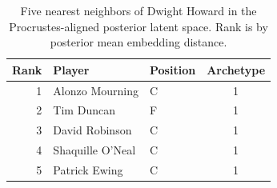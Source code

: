 \begin{table}[htbp]
  \centering\small
  \begin{tabular}{rllc}
    \toprule
    Rank & Player & Position & Archetype \\
    \midrule
    1 & Alonzo Mourning & C & 1 \\
    2 & Tim Duncan & F & 1 \\
    3 & David Robinson & C & 1 \\
    4 & Shaquille O'Neal & C & 1 \\
    5 & Patrick Ewing & C & 1 \\
    \bottomrule
  \end{tabular}
  \caption{Five nearest neighbors of Dwight Howard in the Procrustes-aligned posterior latent space. Rank is by posterior mean embedding distance.}
  \label{tab:Dwight_Howard_neighbors}
\end{table}

